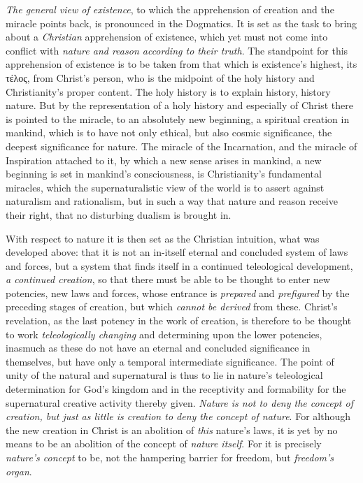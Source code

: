 \documentclass[12pt,a4paper]{book}
\begin{document}
\emph{The general view of existence}, to which the apprehension of creation and the
miracle points back, is pronounced in the Dogmatics. It is set as the task to bring
about a \emph{Christian} apprehension of existence, which yet must not come into conflict
with \emph{nature and reason according to their truth}. The standpoint for this apprehension
of existence is to be taken from that which is existence's highest, its τέλος, from
Christ's person, who is the midpoint of the holy history and Christianity's proper
content. The holy history is to explain history, history nature. But by the
representation of a holy history and especially of Christ there is pointed to the
miracle, to an absolutely new beginning, a spiritual creation in mankind, which is to
have not only ethical, but also cosmic significance, the deepest significance for nature.
The miracle of the Incarnation, and the miracle of Inspiration attached to it, by which a
new sense arises in mankind, a new beginning is set in mankind's consciousness, is
Christianity's fundamental miracles, which the supernaturalistic view of the world is to
assert against naturalism and rationalism, but in such a way that nature and reason receive
their right, that no disturbing dualism is brought in.

With respect to nature it is then set as the Christian intuition, what was developed
above: that it is not an in-itself eternal and concluded system of laws and forces, but a
system that finds itself in a continued teleological development, \emph{a continued creation}, so
that there must be able to be thought to enter new potencies, new laws and forces, whose
entrance is \emph{prepared} and \emph{prefigured} by the preceding stages of creation, but which
\emph{cannot be derived} from these. Christ's revelation, as the last potency in the work of
creation, is therefore to be thought to work \emph{teleologically changing} and
determining upon the lower potencies, inasmuch as these do not have an eternal and
concluded significance in themselves, but have only a temporal intermediate significance.
The point of unity of the natural and supernatural is thus to lie in nature's
teleological determination for God's kingdom and in the receptivity and formability for
the supernatural creative activity thereby given. \emph{Nature is not to deny the concept
of creation, but just as little is creation to deny the concept of nature}. For although
the new creation in Christ is an abolition of \emph{this} nature's laws, it is yet by no means to
be an abolition of the concept of \emph{nature itself}. For it is precisely \emph{nature's concept} to be,
not the hampering barrier for freedom, but \emph{freedom's organ}.
\end{document}

